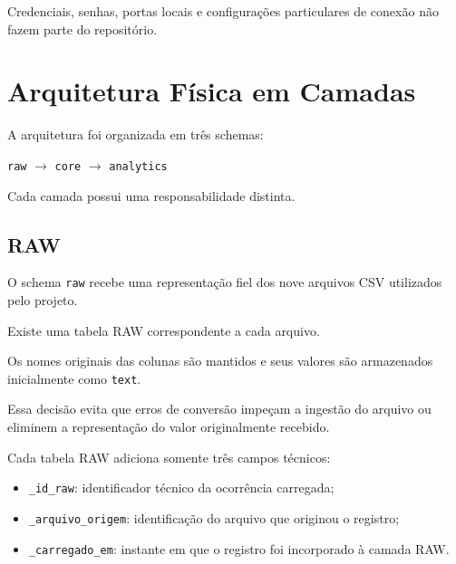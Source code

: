 \documentclass[12pt,a4paper]{article}
\begin{document}
	Credenciais, senhas, portas locais e configurações particulares de
	conexão não fazem parte do repositório.
	
	\section{Arquitetura Física em Camadas}
	
	A arquitetura foi organizada em três schemas:
	
	\begin{center}
		\texttt{raw}
		$\rightarrow$
		\texttt{core}
		$\rightarrow$
		\texttt{analytics}
	\end{center}
	
	Cada camada possui uma responsabilidade distinta.
	
	\subsection{RAW}
	
	O schema \texttt{raw} recebe uma representação fiel dos nove arquivos
	CSV utilizados pelo projeto.
	
	Existe uma tabela RAW correspondente a cada arquivo.
	
	Os nomes originais das colunas são mantidos e seus valores são
	armazenados inicialmente como \texttt{text}.
	
	Essa decisão evita que erros de conversão impeçam a ingestão do
	arquivo ou eliminem a representação do valor originalmente recebido.
	
	Cada tabela RAW adiciona somente três campos técnicos:
	
	\begin{itemize}[leftmargin=1.2cm]
		
		\item \texttt{\_id\_raw}:
		identificador técnico da ocorrência carregada;
		
		\item \texttt{\_arquivo\_origem}:
		identificação do arquivo que originou o registro;
		
		\item \texttt{\_carregado\_em}:
		instante em que o registro foi incorporado à camada RAW.
		
	\end{itemize}
	
\end{document}

